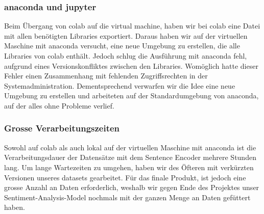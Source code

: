 \subsubsection*{\gls{anaconda} und \gls{jupyter}}
Beim Übergang von \gls{colab} auf die \gls{virtual machine}, haben wir bei \gls{colab} eine Datei mit allen benötigten Libraries exportiert. Daraus haben wir auf der virtuellen Maschine mit \gls{anaconda} versucht, eine neue Umgebung zu erstellen, die alle Libraries von \gls{colab} enthält. Jedoch schlug die Ausführung mit \gls{anaconda} fehl, aufgrund eines Versionskonfliktes zwischen den Libraries. Womöglich hatte dieser Fehler einen Zusammenhang mit fehlenden Zugriffsrechten in der Systemadministration. Dementsprechend verwarfen wir die Idee eine neue Umgebung zu erstellen und arbeiteten auf der Standardumgebung von \gls{anaconda}, auf der alles ohne Probleme verlief.

\subsubsection*{Grosse Verarbeitungszeiten}
Sowohl auf \gls{colab} als auch lokal auf der virtuellen Maschine mit \gls{anaconda} ist die Verarbeitungsdauer der Datensätze mit dem Sentence Encoder mehrere Stunden lang. Um lange Wartezeiten zu umgehen, haben wir des Öfteren mit verkürzten Versionen unseres \gls{dataset}s gearbeitet. Für das finale Produkt, ist jedoch eine grosse Anzahl an Daten erforderlich, weshalb wir gegen Ende des Projektes unser Sentiment-Analysis-Model nochmals mit der ganzen Menge an Daten gefüttert haben.



